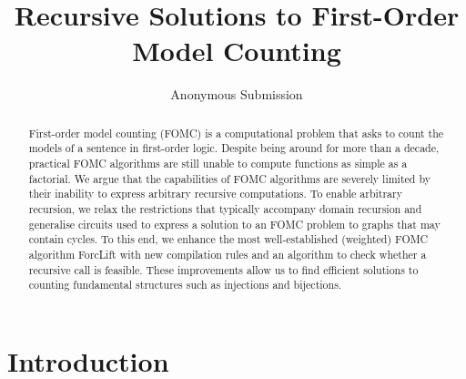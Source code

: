\documentclass[letterpaper]{article} %
\title{Recursive Solutions to First-Order Model Counting}
\author{Anonymous Submission}
\theoremstyle{definition}
\theoremstyle{remark}
\begin{document}
\maketitle

\begin{abstract}
  First-order model counting (FOMC) is a computational problem that asks to
  count the models of a sentence in first-order logic. Despite being around for
  more than a decade, practical FOMC algorithms are still unable to compute
  functions as simple as a factorial. We argue that the capabilities of FOMC
  algorithms are severely limited by their inability to express arbitrary
  recursive computations. To enable arbitrary recursion, we relax the
  restrictions that typically accompany domain recursion and generalise circuits
  used to express a solution to an FOMC problem to graphs that may contain
  cycles. To this end, we enhance the most well-established (weighted) FOMC
  algorithm ForcLift with new compilation rules and an algorithm to check
  whether a recursive call is feasible. These improvements allow us to find
  efficient solutions to counting fundamental structures such as injections and
  bijections.
\end{abstract}

\section{Introduction}

\end{document}
